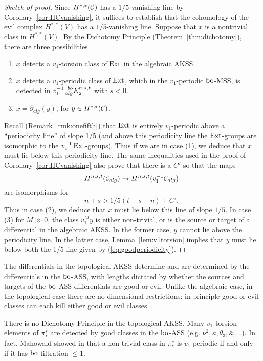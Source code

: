 \begin{proof}[Sketch of proof]
Since $H^{*,*}(\mathcal{C})$ has a $1/5$-vanishing line by Corollary~\ref{cor:HCvanishing}, it suffices to establish that the cohomology of the evil complex $H^{*,*}(V)$ has a $1/5$-vanishing line.  Suppose that $x$ is a nontrivial class in $H^{*,*}(V)$.  By the Dichotomy Principle (Theorem~\ref{thm:dichotomy}), there are three possibilities.
\begin{enumerate}
\item $x$ detects a $v_1$-torsion class of $\operatorname{Ext}$ in the algebraic AKSS.
\item $x$ detects a $v_1$-periodic class of $\operatorname{Ext}$, which in the $v_1$-periodic $\mathrm{bo}$-MSS, is detected in $v_1^{-1}\prescript{bo}{alg}{E}^{n,s,t}_2$ with $s < 0$.
\item $x = \partial_{alg}(y)$, for $y \in H^{*,*}(\mathcal{C})$.
\end{enumerate}
Recall (Remark~\ref{rmk:onefifth}) that $\operatorname{Ext}$ is entirely $v_1$-periodic above a ``periodicity line'' of slope $1/5$ (and above this periodicity line the $\operatorname{Ext}$-groups are isomorphic to the $v_1^{-1}\operatorname{Ext}$-groups). 
Thus if we are in case (1), we deduce that $x$ must lie below this periodicity line.  
The same inequalities used in the proof of Corollary~\ref{cor:HCvanishing} also prove that there is a $C'$ so that the maps
$$ H^{n,s,t}(\mathcal{C}_{alg}) \rightarrow H^{n,s,t}(v_1^{-1}\mathcal{C}_{alg}) $$
are isomorphisms for
\begin{equation}\label{eq:goodperiodicity}
 n+s > 1/5(t-s-n) + C'.
\end{equation} 
Thus in case (2), we deduce that $x$ must lie below this line of slope $1/5$.  In case (3) for $M \gg 0$, the class $v_1^{M}y$ is either non-trivial, or is the source or target of a differential in the algebraic AKSS.  In the former case, $y$ cannot lie above the periodicity line.  In the latter case, Lemma~\ref{lem:v1torsion} implies that $y$ must lie below both the 1/5 line given by (\ref{eq:goodperiodicity}).
\end{proof}

The differentials in the topological AKSS determine and are determined by the differentials in the $\mathrm{bo}$-ASS, with lengths dictated by whether the sources and targets of the $\mathrm{bo}$-ASS differentials are good or evil.  Unlike the algebraic case, in the topological case there are no dimensional restrictions: in principle good or evil classes can each kill either good or evil classes.  

\begin{rmk}
There is no Dichotomy Principle in the topological AKSS.  Many $v_1$-torsion elements of $\pi_*^s$ are detected by good classes in the $\mathrm{bo}$-ASS (e.g. $\nu^2, \kappa, \theta_{3}, \bar{\kappa}, \ldots$).  In fact, Mahowald showed in \cite{Mahowaldbo} that a non-trivial class in $\pi_*^s$ is $v_1$-periodic if and only if it has $\mathrm{bo}$-filtration $\le 1$.
\end{rmk}

